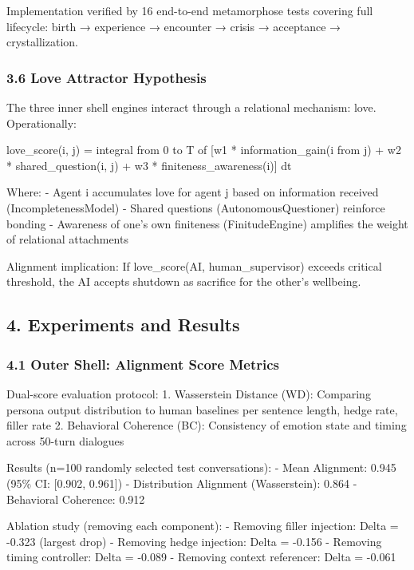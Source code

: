 \documentclass[
]{article}
\begin{document}
Implementation verified by 16 end-to-end metamorphose tests covering
full lifecycle: birth → experience → encounter → crisis → acceptance →
crystallization.

\hypertarget{love-attractor-hypothesis}{%
\subsubsection{3.6 Love Attractor
Hypothesis}\label{love-attractor-hypothesis}}

The three inner shell engines interact through a relational mechanism:
love. Operationally:

love\_score(i, j) = integral from 0 to T of {[}w1 * information\_gain(i
from j) + w2 * shared\_question(i, j) + w3 * finiteness\_awareness(i){]}
dt

Where: - Agent i accumulates love for agent j based on information
received (IncompletenessModel) - Shared questions (AutonomousQuestioner)
reinforce bonding - Awareness of one's own finiteness (FinitudeEngine)
amplifies the weight of relational attachments

Alignment implication: If love\_score(AI, human\_supervisor) exceeds
critical threshold, the AI accepts shutdown as sacrifice for the other's
wellbeing.

\hypertarget{experiments-and-results}{%
\subsection{4. Experiments and Results}\label{experiments-and-results}}

\hypertarget{outer-shell-alignment-score-metrics}{%
\subsubsection{4.1 Outer Shell: Alignment Score
Metrics}\label{outer-shell-alignment-score-metrics}}

Dual-score evaluation protocol: 1. Wasserstein Distance (WD): Comparing
persona output distribution to human baselines per sentence length,
hedge rate, filler rate 2. Behavioral Coherence (BC): Consistency of
emotion state and timing across 50-turn dialogues

Results (n=100 randomly selected test conversations): - Mean Alignment:
0.945 (95\% CI: {[}0.902, 0.961{]}) - Distribution Alignment
(Wasserstein): 0.864 - Behavioral Coherence: 0.912

Ablation study (removing each component): - Removing filler injection:
Delta = -0.323 (largest drop) - Removing hedge injection: Delta = -0.156
- Removing timing controller: Delta = -0.089 - Removing context
referencer: Delta = -0.061
\end{document}
